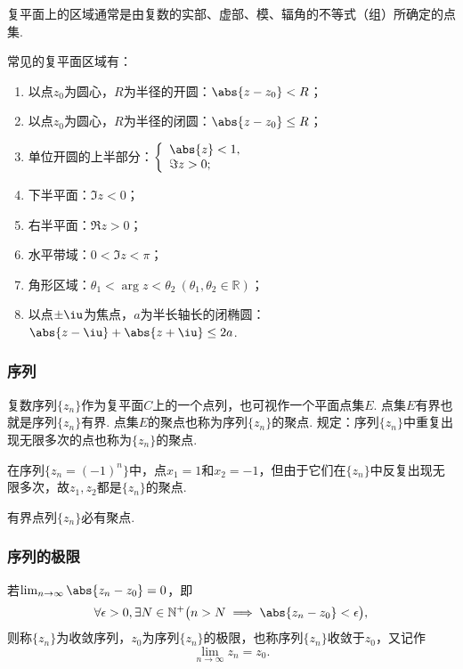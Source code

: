 复平面上的区域通常是由复数的实部、虚部、模、辐角的不等式（组）所确定的点集.
\begin{example}
常见的复平面区域有：\begin{enumerate}
\item 以点\(z_0\)为圆心，\(R\)为半径的开圆：\(\abs{z-z_0}<R\)；
\item 以点\(z_0\)为圆心，\(R\)为半径的闭圆：\(\abs{z-z_0} \leq R\)；
\item 单位开圆的上半部分：\(\left\{ \begin{array}{l}
\abs{z}<1, \\
\Im z > 0;
\end{array} \right.\)
\item 下半平面：\(\Im z < 0\)；
\item 右半平面：\(\Re z > 0\)；
\item 水平带域：\(0 < \Im z < \pi\)；
\item 角形区域：\(\theta_1 < \arg z < \theta_2\ (\theta_1,\theta_2\in\mathbb{R})\)；
\item 以点\(\pm\iu\)为焦点，\(a\)为半长轴长的闭椭圆：\(\abs{z-\iu}+\abs{z+\iu}\leq2a\).
\end{enumerate}
\end{example}

\subsubsection{序列}
\begin{definition}
复数序列\(\{z_n\}\)作为复平面\(C\)上的一个点列，也可视作一个平面点集\(E\).
点集\(E\)有界也就是序列\(\{z_n\}\)有界.
点集\(E\)的聚点也称为序列\(\{z_n\}\)的聚点.
规定：序列\(\{z_n\}\)中重复出现无限多次的点也称为\(\{z_n\}\)的聚点.
\end{definition}

\begin{example}
在序列\(\{z_n = (-1)^n\}\)中，点\(x_1=1\)和\(x_2=-1\)，但由于它们在\(\{z_n\}\)中反复出现无限多次，故\(z_1,z_2\)都是\(\{z_n\}\)的聚点.
\end{example}

\begin{theorem}\label{theorem:复变函数.波莱尔--魏尔斯特拉斯定理}
有界点列\(\{z_n\}\)必有聚点.
\end{theorem}

\subsubsection{序列的极限}
\begin{definition}
若\(\lim_{n\to\infty} \abs{z_n - z_0} = 0\)，即\[
\forall \epsilon > 0, \exists N \in \mathbb{N}^+ \bigl(
n > N \implies \abs{z_n - z_0} < \epsilon
\bigr),
\]则称\(\{z_n\}\)为收敛序列，\(z_0\)为序列\(\{z_n\}\)的极限，也称序列\(\{z_n\}\)收敛于\(z_0\)，又记作\[
\lim_{n\to\infty} z_n = z_0.
\]
\end{definition}

